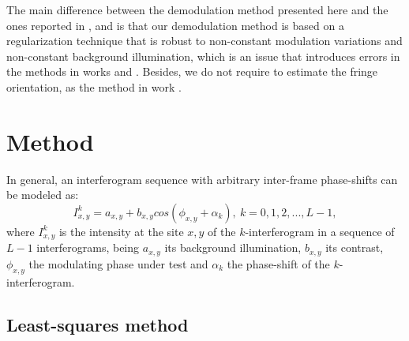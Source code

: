 \documentclass[letterpaper,12pt]{article}   %
\begin{document}
The main difference between the demodulation method presented here and
the ones reported in \cite{a14},\cite{a15} and \cite{a17} is that our
demodulation method is based on a regularization technique that is
robust to non-constant modulation variations and non-constant
background illumination, which is an issue that introduces errors in
the methods in works \cite{a14} and \cite{a15}. Besides, we do not
require to estimate the fringe orientation, as the method in work
\cite{a17}.

\section{Method}

In general, an interferogram sequence with arbitrary inter-frame
phase-shifts can be modeled as:
\begin{equation}\label{I_k1}
  I_{x,y}^k=a_{x,y}+b_{x,y}cos(\phi_{x,y}+\alpha_k),\: k=0,1,2,...,L-1,
\end{equation}
where $I_{x,y}^k$ is the intensity at the site $x,y$ of the
$k$-interferogram in a sequence of $L-1$ interferograms, being
$a_{x,y}$ its background illumination, $b_{x,y}$ its contrast,
$\phi_{x,y}$ the modulating phase under test and $\alpha_k$ the
phase-shift of the $k$-interferogram.

\subsection{Least-squares method}
\end{document}
